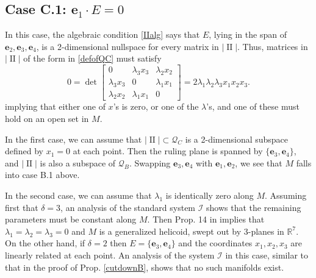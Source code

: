 \documentclass[12pt,reqno]{amsart}
\theoremstyle{definition}
\theoremstyle{remark}
\begin{document}
\subsection*{Case C.1: ${\mathbf e}_1\cdot E=0$}
In this case, the algebraic condition \eqref{IIalg} says that $E$, lying
in the span of ${\mathbf e}_2, {\mathbf e}_3, {\mathbf e}_4$, is a 2-dimensional nullspace for every matrix in $|{\operatorname{II}} |$.  Thus, matrices
in $|{\operatorname{II}}|$ of the form in \eqref{defofQC} must satisfy
$$0=\det   \begin{bmatrix} 0 & \lambda_3x_3& \lambda_2x_2 \\
\lambda_3x_3& 0 & \lambda_1x_1\\  \lambda_2x_2 & \lambda_1x_1&0 \end{bmatrix}
=2\lambda_1\lambda_2\lambda_3x_1x_2x_3.$$
implying that either one of $x$'s is zero, or one of the $\lambda$'s, and one of these must hold on
an open set in $M$.

In the first case, we can assume that $|{\operatorname{II}} |\subset {\mathcal Q}_C$ is a 2-dimensional subspace defined by $x_1=0$ at each point.
Then the ruling plane is spanned by $\{{\mathbf e}_3,{\mathbf e}_4\}$, and $|{\operatorname{II}}|$ is also a subspace of ${\mathcal Q}_B$.
Swapping ${\mathbf e}_3,{\mathbf e}_4$ with ${\mathbf e}_1,{\mathbf e}_2$, we see that $M$ falls into case B.1 above.

In the second case, we can assume that $\lambda_1$ is identically zero along $M$.
Assuming first that $\delta=3$, an analysis of the standard system ${{\mathcal I}}$ shows that
the remaining parameters must be constant along $M$.  Then Prop. 14 in \cite{ayeaye} implies that
$\lambda_1=\lambda_2=\lambda_3=0$ and $M$ is a generalized helicoid, swept out by 3-planes in ${\mathbb R}^7$.
On the other hand, if $\delta=2$ then  $E=\{{\mathbf e}_3,{\mathbf e}_4\}$ and the coordinates $x_1, x_2,x_3$ are linearly
related at each point.  An analysis of the system ${{\mathcal I}}$ in this case, similar to that in the proof of Prop. \ref{cutdownB},
shows that no such manifolds exist.
\end{document}

